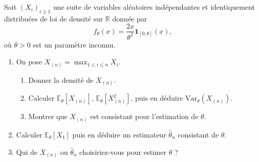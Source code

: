 \begin{mdframed}
\begin{exercice}
Soit $(X_i)_{i \ge 1}$ une suite de variables aléatoires indépendantes et identiquement distribuées de loi de densité sur $\mathbb{R}$ donnée par
\begin{equation*}
f_\theta(x) = \frac{2x}{\theta^2} \mathbf{1}_{[0, \theta]}(x),
\end{equation*}
où $\theta > 0$ est un paramètre inconnu.

\begin{enumerate}
    \item On pose $X_{(n)} = \max_{1 \le i \le n} X_i$.
    \begin{enumerate}
        \item[i--] Donner la densité de $X_{(n)}$.
        \item[ii--] Calculer $\mathbb{E}_\theta[X_{(n)}]$, $\mathbb{E}_\theta[X_{(n)}^2]$, puis en déduire $\text{Var}_\theta(X_{(n)})$.
        \item[iii--] Montrer que $X_{(n)}$ est consistant pour l'estimation de $\theta$.
    \end{enumerate}
    \item Calculer $\mathbb{E}_\theta[X_1]$ puis en déduire un estimateur $\hat{\theta}_n$ consistant de $\theta$.
    \item Qui de $X_{(n)}$ ou $\hat{\theta}_n$ choisiriez-vous pour estimer $\theta$ ?
\end{enumerate}
\end{exercice}
\end{mdframed}

\smallskip

